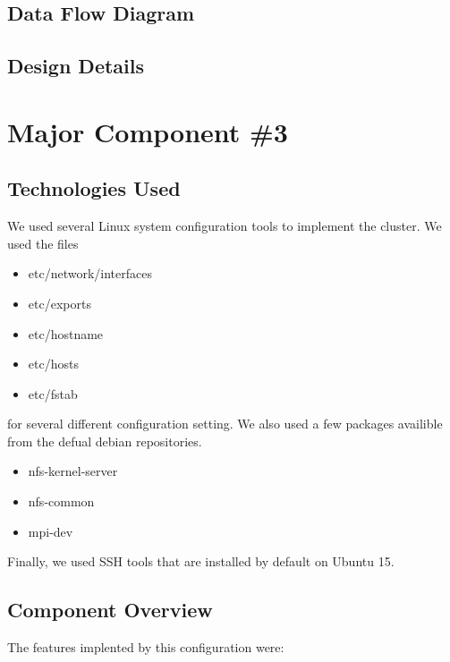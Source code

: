 \subsection{Data Flow Diagram}


\subsection{Design Details}


\section{Major Component \#3 }

\subsection{Technologies  Used}
We used several Linux system configuration tools to implement the cluster. We used the files
\begin{itemize}
	\item etc/network/interfaces
	\item etc/exports
	\item etc/hostname
	\item etc/hosts
	\item etc/fstab
\end{itemize}
for several different configuration setting. We also used a few packages availible from the defual debian repositories.
\begin{itemize}
	\item nfs-kernel-server
	\item nfs-common
	\item mpi-dev
\end{itemize}

Finally, we used SSH tools that are installed by default on Ubuntu 15.


\subsection{Component  Overview}
The features implented by this configuration were:

